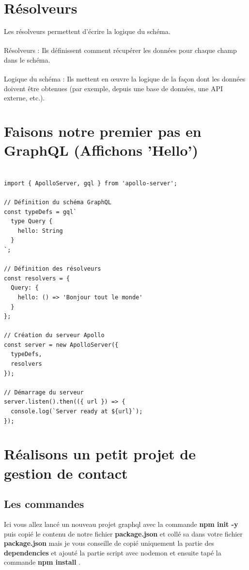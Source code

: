 \documentclass[a4paper,12pt]{article}
\begin{document}
\section*{Résolveurs}
Les résolveurs permettent d'écrire la logique du schéma. \\\\
Résolveurs : Ils définissent comment récupérer les données pour chaque champ dans le schéma.\\\\
Logique du schéma : Ils mettent en œuvre la logique de la façon dont les données doivent être obtenues (par exemple, depuis une base de données, une API externe, etc.).

\section{Faisons notre premier pas en GraphQL (Affichons 'Hello')}
\begin{verbatim}

import { ApolloServer, gql } from 'apollo-server';

// Définition du schéma GraphQL
const typeDefs = gql`
  type Query {
    hello: String
  }
`;

// Définition des résolveurs
const resolvers = {
  Query: {
    hello: () => 'Bonjour tout le monde'
  }
};

// Création du serveur Apollo
const server = new ApolloServer({
  typeDefs,
  resolvers
});

// Démarrage du serveur
server.listen().then(({ url }) => {
  console.log(`Server ready at ${url}`);
});

\end{verbatim}
\section{Réalisons un petit projet de gestion de contact }


\subsection{Les commandes }

Ici vous allez lancé un nouveau projet graphql avec la commande \textbf{npm init -y} puis copié le contenu de notre fichier \textbf{package.json} et collé sa dans votre fichier \textbf{package.json} mais je vous conseille de copié uniquement la partie des \textbf{dependencies} et ajouté la partie script avec nodemon et ensuite tapé la commande \textbf{npm install} .
\end{document}
